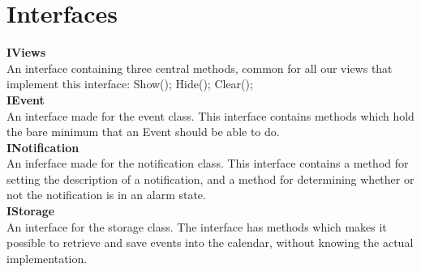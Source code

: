 \section{Interfaces}

\textbf{IViews\\}
An interface containing three central methods, common for all our views that implement this interface:
Show();
Hide();
Clear();\\

\textbf{IEvent\\}
An interface made for the event class. This interface contains methods which hold the bare minimum that an Event should be able to do.\\

\textbf{INotification\\}
An inferface made for the notification class. This interface contains a method for setting the description of a notification, and a method for determining whether or not the notification is in an alarm state.\\

\textbf{IStorage\\}
An interface for the storage class. The interface has methods which makes it possible to retrieve and save events into the calendar, without knowing the actual implementation.
